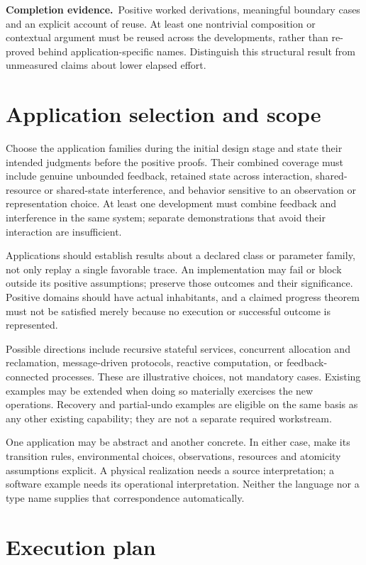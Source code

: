 \documentclass[11pt,a4paper]{article}
\newcommand{\deliver}{\par\textbf{Completion evidence.}\ }
\begin{document}
\deliver Positive worked derivations, meaningful boundary cases and an explicit account of reuse. At least one nontrivial composition or contextual argument must be reused across the developments, rather than re-proved behind application-specific names. Distinguish this structural result from unmeasured claims about lower elapsed effort.

\section{Application selection and scope}\label{sec:applications}

Choose the application families during the initial design stage and state their intended judgments before the positive proofs. Their combined coverage must include genuine unbounded feedback, retained state across interaction, shared-resource or shared-state interference, and behavior sensitive to an observation or representation choice. At least one development must combine feedback and interference in the same system; separate demonstrations that avoid their interaction are insufficient.

Applications should establish results about a declared class or parameter family, not only replay a single favorable trace. An implementation may fail or block outside its positive assumptions; preserve those outcomes and their significance. Positive domains should have actual inhabitants, and a claimed progress theorem must not be satisfied merely because no execution or successful outcome is represented.

Possible directions include recursive stateful services, concurrent allocation and reclamation, message-driven protocols, reactive computation, or feedback-connected processes. These are illustrative choices, not mandatory cases. Existing examples may be extended when doing so materially exercises the new operations. Recovery and partial-undo examples are eligible on the same basis as any other existing capability; they are not a separate required workstream.

One application may be abstract and another concrete. In either case, make its transition rules, environmental choices, observations, resources and atomicity assumptions explicit. A physical realization needs a source interpretation; a software example needs its operational interpretation. Neither the language nor a type name supplies that correspondence automatically.

\section{Execution plan}\label{sec:plan}
\end{document}
